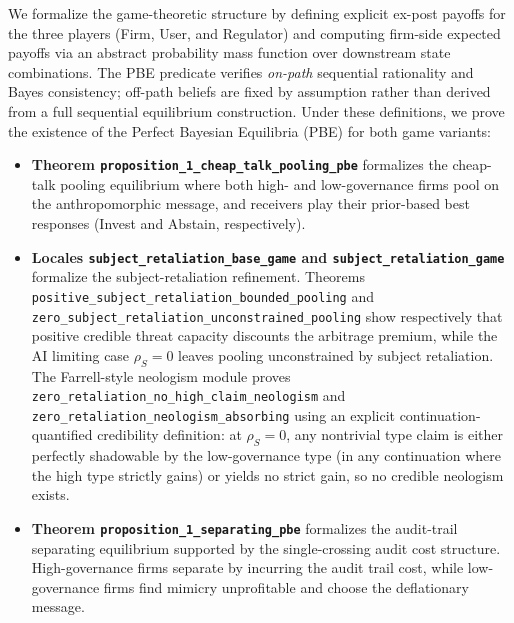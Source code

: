We formalize the game-theoretic structure by defining explicit ex-post payoffs for the three players (Firm, User, and Regulator) and computing firm-side expected payoffs via an abstract probability mass function over downstream state combinations. The PBE predicate verifies \emph{on-path} sequential rationality and Bayes consistency; off-path beliefs are fixed by assumption rather than derived from a full sequential equilibrium construction. Under these definitions, we prove the existence of the Perfect Bayesian Equilibria (PBE) for both game variants:
\begin{itemize}
    \item \textbf{Theorem \texttt{proposition\_\allowbreak{}1\_\allowbreak{}cheap\_\allowbreak{}talk\_\allowbreak{}pooling\_\allowbreak{}pbe}} formalizes the cheap-talk pooling equilibrium where both high- and low-governance firms pool on the anthropomorphic message, and receivers play their prior-based best responses (Invest and Abstain, respectively).
    \item \textbf{Locales \texttt{subject\_\allowbreak{}retaliation\_\allowbreak{}base\_\allowbreak{}game} and \texttt{subject\_\allowbreak{}retaliation\_\allowbreak{}game}} formalize the subject-retaliation refinement. Theorems \texttt{positive\_\allowbreak{}subject\_\allowbreak{}retaliation\_\allowbreak{}bounded\_\allowbreak{}pooling} and \texttt{zero\_\allowbreak{}subject\_\allowbreak{}retaliation\_\allowbreak{}unconstrained\_\allowbreak{}pooling} show respectively that positive credible threat capacity discounts the arbitrage premium, while the AI limiting case $\rho_S=0$ leaves pooling unconstrained by subject retaliation. The Farrell-style neologism module proves \texttt{zero\_\allowbreak{}retaliation\_\allowbreak{}no\_\allowbreak{}high\_\allowbreak{}claim\_\allowbreak{}neologism} and \texttt{zero\_\allowbreak{}retaliation\_\allowbreak{}neologism\_\allowbreak{}absorbing} using an explicit continuation-quantified credibility definition: at $\rho_S=0$, any nontrivial type claim is either perfectly shadowable by the low-governance type (in any continuation where the high type strictly gains) or yields no strict gain, so no credible neologism exists.
    \item \textbf{Theorem \texttt{proposition\_\allowbreak{}1\_\allowbreak{}separating\_\allowbreak{}pbe}} formalizes the audit-trail separating equilibrium supported by the single-crossing audit cost structure. High-governance firms separate by incurring the audit trail cost, while low-governance firms find mimicry unprofitable and choose the deflationary message.
\end{itemize}

